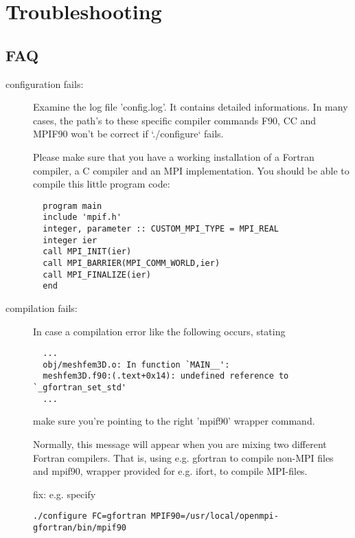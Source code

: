 \chapter{Troubleshooting}\label{cha:Troubleshooting}

\section*{FAQ}

\begin{description}
\item [configuration fails:]
Examine the log file 'config.log'. It contains detailed informations.
In many cases, the path's to these specific compiler commands F90,
CC and MPIF90 won't be correct if `./configure` fails.\newline


Please make sure that you have a working installation of a Fortran compiler,
a C compiler and an MPI implementation. You should be able to compile this
little program code:\newline

{\footnotesize
\begin{verbatim}
  program main
  include 'mpif.h'
  integer, parameter :: CUSTOM_MPI_TYPE = MPI_REAL
  integer ier
  call MPI_INIT(ier)
  call MPI_BARRIER(MPI_COMM_WORLD,ier)
  call MPI_FINALIZE(ier)
  end
\end{verbatim}
}

\item [compilation fails:]
In case a compilation error like the following occurs, stating

{\footnotesize
\begin{verbatim}
  ...
  obj/meshfem3D.o: In function `MAIN__':
  meshfem3D.f90:(.text+0x14): undefined reference to `_gfortran_set_std'
  ...
\end{verbatim}
}
\noindent
make sure you're pointing to the right 'mpif90' wrapper command.\newline


Normally, this message will appear when you are mixing two different Fortran
compilers. That is, using e.g. gfortran to compile non-MPI files
and mpif90, wrapper provided for e.g. ifort, to compile MPI-files.\newline


fix: e.g. specify
\begin{verbatim}
./configure FC=gfortran MPIF90=/usr/local/openmpi-gfortran/bin/mpif90
\end{verbatim}


\end{description}
